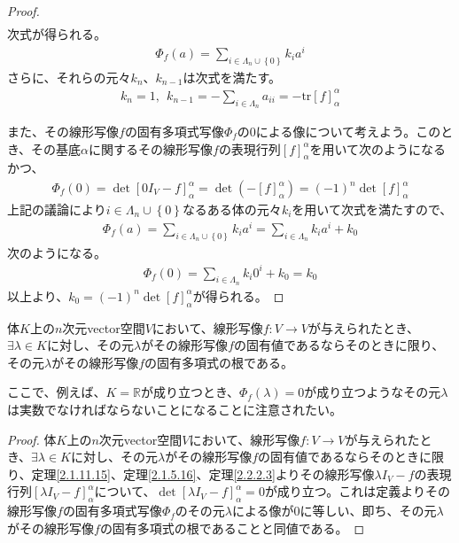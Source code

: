 \documentclass[dvipdfmx]{jsarticle}
\begin{document}
\begin{proof}
\begin{align*}
\end{align*}
次式が得られる。
\begin{align*}
\varPhi_{f}(a) = \sum_{i \in \varLambda_{n} \cup \left\{ 0 \right\}} {k_{i}a^{i}}
\end{align*}
さらに、それらの元々$k_{n}$、$k_{n - 1}$は次式を満たす。
\begin{align*}
k_{n} = 1,\ \ k_{n - 1} = - \sum_{i \in \varLambda_{n}} a_{ii} = - {\mathrm{tr} }[ f]_{\alpha}^{\alpha}
\end{align*}\par
また、その線形写像$f$の固有多項式写像$\varPhi_{f}$の0による像について考えよう。このとき、その基底$\alpha$に関するその線形写像$f$の表現行列$[ f]_{\alpha}^{\alpha}$を用いて次のようになるかつ、
\begin{align*}
\varPhi_{f}(0) = \det\left[ 0I_{V} - f \right]_{\alpha}^{\alpha} = \det\left( - [ f]_{\alpha}^{\alpha} \right) = ( - 1)^{n}\det[ f]_{\alpha}^{\alpha}
\end{align*}
上記の議論により$i \in \varLambda_{n} \cup \left\{ 0 \right\}$なるある体の元々$k_{i}$を用いて次式を満たすので、
\begin{align*}
\varPhi_{f}(a) = \sum_{i \in \varLambda_{n} \cup \left\{ 0 \right\}} {k_{i}a^{i}} = \sum_{i \in \varLambda_{n}} {k_{i}a^{i}} + k_{0}
\end{align*}
次のようになる。
\begin{align*}
\varPhi_{f}(0) = \sum_{i \in \varLambda_{n}} {k_{i}0^{i}} + k_{0} = k_{0}
\end{align*}
以上より、$k_{0} = ( - 1)^{n}\det[ f]_{\alpha}^{\alpha}$が得られる。
\end{proof}
\begin{thm}\label{2.2.2.6}
体$K$上の$n$次元vector空間$V$において、線形写像$f:V \rightarrow V$が与えられたとき、$\exists\lambda \in K$に対し、その元$\lambda$がその線形写像$f$の固有値であるならそのときに限り、その元$\lambda$がその線形写像$f$の固有多項式の根である。
\end{thm}\par
ここで、例えば、$K = \mathbb{R}$が成り立つとき、$\varPhi_{f}(\lambda) = 0$が成り立つようなその元$\lambda$は実数でなければならないことになることに注意されたい。
\begin{proof}
体$K$上の$n$次元vector空間$V$において、線形写像$f:V \rightarrow V$が与えられたとき、$\exists\lambda \in K$に対し、その元$\lambda$がその線形写像$f$の固有値であるならそのときに限り、定理\ref{2.1.11.15}、定理\ref{2.1.5.16}、定理\ref{2.2.2.3}よりその線形写像$\lambda I_{V} - f$の表現行列$\left[ \lambda I_{V} - f \right]_{\alpha}^{\alpha}$について、$\det\left[ \lambda I_{V} - f \right]_{\alpha}^{\alpha} = 0$が成り立つ。これは定義よりその線形写像$f$の固有多項式写像$\varPhi_{f}$のその元$\lambda$による像が0に等しい、即ち、その元$\lambda$がその線形写像$f$の固有多項式の根であることと同値である。
\end{proof}
\end{document}
